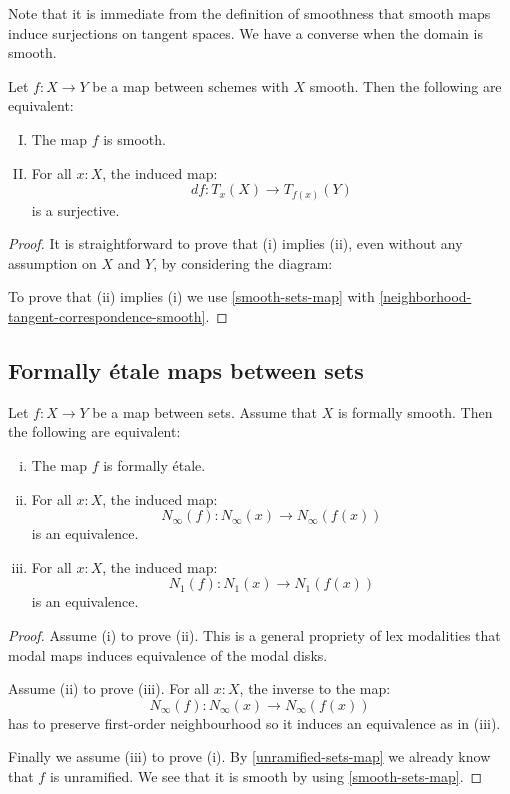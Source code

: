 Note that it is immediate from the definition of smoothness that smooth maps induce surjections on tangent spaces. We have a converse when the domain is smooth.

\begin{corollary}\label{smooth-schemes-iff-submersion}
Let $f:X\to Y$ be a map between schemes with $X$ smooth. Then the following are equivalent:
\begin{enumerate}[(I)] 
\item The map $f$ is smooth.
\item For all $x:X$, the induced map:
\[df : T_x(X)\to T_{f(x)}(Y)\]
is a surjective.
\end{enumerate}
\end{corollary}

\begin{proof}
It is straightforward to prove that (i) implies (ii), even without any assumption on $X$ and $Y$, by considering the diagram:
 \begin{center}
    \end{center}
To prove that (ii) implies (i) we use \cref{smooth-sets-map} with \cref{neighborhood-tangent-correspondence-smooth}.
\end{proof}

\subsection{Formally étale maps between sets}

\begin{proposition}\label{etale-sets-map}
Let $f:X\to Y$ be a map between sets. Assume that $X$ is formally smooth. Then the following are equivalent:
\begin{enumerate}[(i)]
\item The map $f$ is formally étale. 
\item For all $x:X$, the induced map:
\[N_\infty(f) : N_\infty(x)\to N_\infty(f(x))\]
is an equivalence.
\item For all $x:X$, the induced map:
\[N_1(f) : N_1(x)\to N_1(f(x))\]
is an equivalence.
\end{enumerate}
\end{proposition}

\begin{proof}
Assume (i) to prove (ii). This is a general propriety of lex modalities that modal maps induces equivalence of the modal disks.

Assume (ii) to prove (iii). For all $x:X$, the inverse to the map: 
\[N_\infty(f) : N_\infty(x)\to N_\infty(f(x))\]
has to preserve first-order neighbourhood so it induces an equivalence as in (iii).

Finally we assume (iii) to prove (i). By \cref{unramified-sets-map} we already know that $f$ is unramified. We see that it is smooth by using \cref{smooth-sets-map}.
\end{proof}

